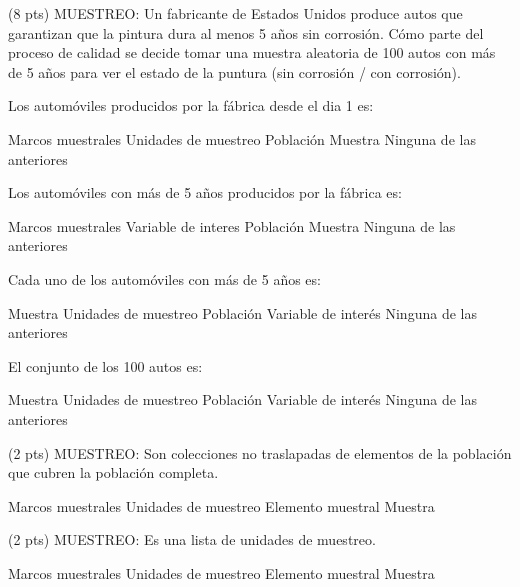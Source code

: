 \documentclass[addpoints]{exam}
\theoremstyle{mytheor}
\begin{document}
  \begin{questions}
  
  \question (8 pts) MUESTREO: Un fabricante de Estados Unidos produce autos que garantizan que la pintura dura al menos 5 años sin corrosión. Cómo parte del proceso de calidad se decide tomar una muestra aleatoria de 100 autos con más de 5 años para ver el estado de la puntura (sin corrosión / con corrosión).

Los automóviles producidos por la fábrica desde el dia 1 es:

\begin{checkboxes}
  \choice Marcos muestrales
  \choice Unidades de muestreo
  \choice Población
  \choice Muestra
  \choice Ninguna de las anteriores
\end{checkboxes}
  
Los automóviles con más de 5 años producidos por la fábrica es:

\begin{checkboxes}
  \choice Marcos muestrales
  \choice Variable de interes
  \choice Población
  \choice Muestra
  \choice Ninguna de las anteriores
\end{checkboxes}


Cada uno de los automóviles con más de 5 años es:
\begin{checkboxes}
  \choice Muestra
  \choice Unidades de muestreo
  \choice Población
  \choice Variable de interés
  \choice Ninguna de las anteriores
\end{checkboxes}

El conjunto de los 100 autos es:
\begin{checkboxes}
  \choice Muestra
  \choice Unidades de muestreo
  \choice Población
  \choice Variable de interés
  \choice Ninguna de las anteriores
\end{checkboxes}

\question (2 pts) MUESTREO: Son colecciones no traslapadas de elementos de la población que cubren la población completa.
  
  \begin{checkboxes}
  \choice Marcos muestrales
  \choice Unidades de muestreo
  \choice Elemento muestral
  \choice Muestra
  \end{checkboxes}
  
\question (2 pts) MUESTREO: Es una lista de unidades de muestreo.
  
  \begin{checkboxes}
  \choice Marcos muestrales
  \choice Unidades de muestreo
  \choice Elemento muestral
  \choice Muestra
  \end{checkboxes}
  

\end{questions}
\end{document}
